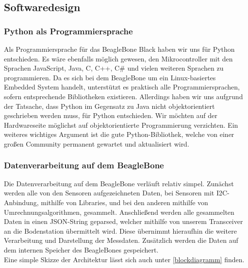 \subsection{Softwaredesign}
\subsubsection{Python als Programmiersprache}
Als Programmiersprache für das BeagleBone Black haben wir uns für Python entschieden. Es wäre ebenfalls möglich gewesen, den Mikrocontroller mit den Sprachen JavaScript, Java, C, C++, C\# und vielen weiteren Sprachen zu programmieren. Da es sich bei dem BeagleBone um ein Linux-basiertes Embedded System handelt, unterstützt es praktisch alle Programmiersprachen, sofern entsprechende Bibliotheken existieren. Allerdings haben wir uns aufgrund der Tatsache, dass Python im Gegensatz zu Java nicht objektorientiert geschrieben werden muss, für Python entschieden. Wir möchten auf der Hardwareseite möglichst auf objektorientierte Programmierung verzichten. Ein weiteres wichtiges Argument ist die gute Python-Bibliothek, welche von einer großen Community permanent gewartet und aktualisiert wird.
\subsubsection{Datenverarbeitung auf dem BeagleBone}
Die Datenverarbeitung auf dem BeagleBone verläuft relativ simpel. Zunächst werden alle von den Sensoren aufgezeichneten Daten, bei Sensoren mit I2C-Anbindung, mithilfe von Libraries, und bei den anderen mithilfe von Umrechnungsalgorithmen, gesammelt. Anschließend werden alle gesammelten Daten in einen JSON-String geparsed, welcher mithilfe von unserem Transceiver an die Bodenstation übermittelt wird. Diese übernimmt hieraufhin die weitere Verarbeitung und Darstellung der Messdaten. Zusätzlich werden die Daten auf dem internen Speicher des BeagleBones gespeichert. \\
Eine simple Skizze der Architektur lässt sich auch unter \ref{blockdiagramm} finden.